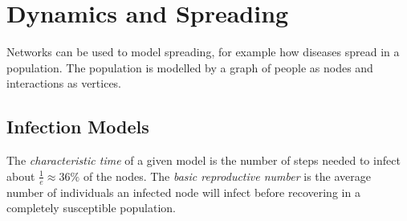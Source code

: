 \documentclass[english]{panikzettel}
\begin{document}
\section{Dynamics and Spreading}

Networks can be used to model spreading, for example how diseases spread in a population.
The population is modelled by a graph of people as nodes and interactions as vertices.

\subsection{Infection Models}

The \textit{characteristic time} of a given model is the number of steps needed to infect about $\frac{1}{e} \approx 36\%$ of the nodes.
The \textit{basic reproductive number} is the average number of individuals an infected node will infect before recovering in a completely susceptible population.
\end{document}
